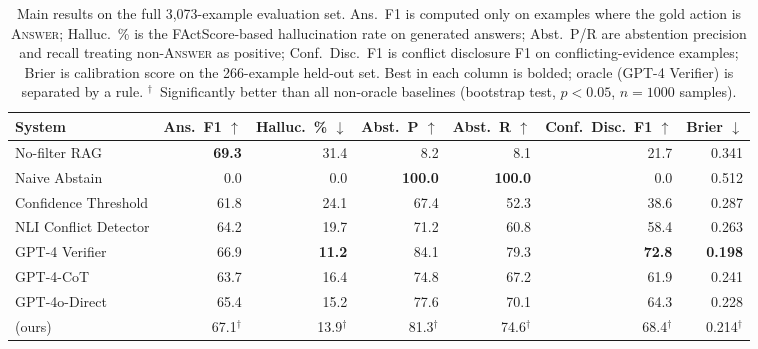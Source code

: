 \begin{table}[t]
\centering
\small
\begin{tabular}{lrrrrrr}
\toprule
System & Ans.\ F1 $\uparrow$ & Halluc.\ \% $\downarrow$ & Abst.\ P $\uparrow$ & Abst.\ R $\uparrow$ & Conf.\ Disc.\ F1 $\uparrow$ & Brier $\downarrow$ \\
\midrule
No-filter RAG         & \textbf{69.3} & 31.4 &  8.2 &  8.1 & 21.7 & 0.341 \\
Naive Abstain         &  0.0 & \phantom{0}0.0 & \textbf{100.0} & \textbf{100.0} &  0.0 & 0.512 \\
Confidence Threshold  & 61.8 & 24.1 & 67.4 & 52.3 & 38.6 & 0.287 \\
NLI Conflict Detector & 64.2 & 19.7 & 71.2 & 60.8 & 58.4 & 0.263 \\
GPT-4 Verifier        & 66.9 & \textbf{11.2} & 84.1 & 79.3 & \textbf{72.8} & \textbf{0.198} \\
GPT-4-CoT             & 63.7 & 16.4 & 74.8 & 67.2 & 61.9 & 0.241 \\
GPT-4o-Direct         & 65.4 & 15.2 & 77.6 & 70.1 & 64.3 & 0.228 \\
\midrule
\method{} (ours)      & 67.1$^{\dagger}$ & 13.9$^{\dagger}$ & 81.3$^{\dagger}$ & 74.6$^{\dagger}$ & 68.4$^{\dagger}$ & 0.214$^{\dagger}$ \\
\bottomrule
\end{tabular}
\caption{Main results on the full 3,073-example evaluation set. Ans.\ F1 is computed only on examples where the gold action is \textsc{Answer}; Halluc.\ \% is the FActScore-based hallucination rate on generated answers; Abst.\ P/R are abstention precision and recall treating non-\textsc{Answer} as positive; Conf.\ Disc.\ F1 is conflict disclosure F1 on conflicting-evidence examples; Brier is calibration score on the 266-example held-out set. Best in each column is bolded; oracle (GPT-4 Verifier) is separated by a rule. $^{\dagger}$~Significantly better than all non-oracle baselines (bootstrap test, $p{<}0.05$, $n{=}1000$ samples).}
\label{tab:main}
\end{table}

